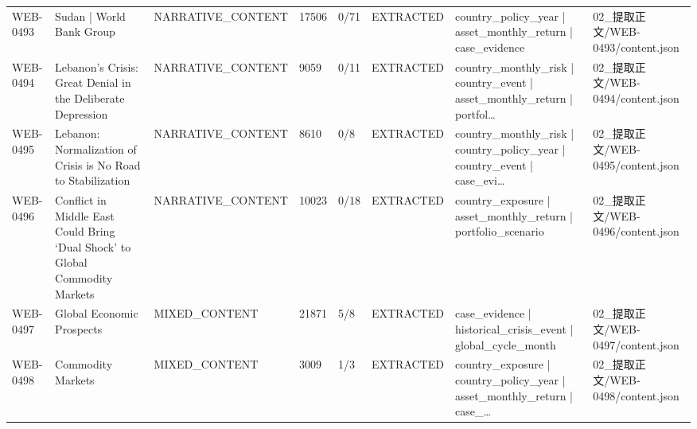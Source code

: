 \begin{landscape}
\begin{longtable}{p{1.8cm}p{4.2cm}p{3.0cm}p{1.4cm}p{1.6cm}p{2.4cm}p{4.2cm}p{4.2cm}}
WEB-0493 & Sudan | World Bank Group & NARRATIVE\_\allowbreak{}CONTENT & 17506 & 0/\allowbreak{}71 & EXTRACTED & country\_\allowbreak{}policy\_\allowbreak{}year | asset\_\allowbreak{}monthly\_\allowbreak{}return | case\_\allowbreak{}evidence & 02\_\allowbreak{}提取正文/\allowbreak{}WEB-0493/\allowbreak{}content.json\\
WEB-0494 & Lebanon’s Crisis: Great Denial in the Deliberate Depression & NARRATIVE\_\allowbreak{}CONTENT & 9059 & 0/\allowbreak{}11 & EXTRACTED & country\_\allowbreak{}monthly\_\allowbreak{}risk | country\_\allowbreak{}event | asset\_\allowbreak{}monthly\_\allowbreak{}return | portfol… & 02\_\allowbreak{}提取正文/\allowbreak{}WEB-0494/\allowbreak{}content.json\\
WEB-0495 & Lebanon: Normalization of Crisis is No Road to Stabilization & NARRATIVE\_\allowbreak{}CONTENT & 8610 & 0/\allowbreak{}8 & EXTRACTED & country\_\allowbreak{}monthly\_\allowbreak{}risk | country\_\allowbreak{}policy\_\allowbreak{}year | country\_\allowbreak{}event | case\_\allowbreak{}evi… & 02\_\allowbreak{}提取正文/\allowbreak{}WEB-0495/\allowbreak{}content.json\\
WEB-0496 & Conflict in Middle East Could Bring ‘Dual Shock’ to Global Commodity Markets & NARRATIVE\_\allowbreak{}CONTENT & 10023 & 0/\allowbreak{}18 & EXTRACTED & country\_\allowbreak{}exposure | asset\_\allowbreak{}monthly\_\allowbreak{}return | portfolio\_\allowbreak{}scenario & 02\_\allowbreak{}提取正文/\allowbreak{}WEB-0496/\allowbreak{}content.json\\
WEB-0497 & Global Economic Prospects & MIXED\_\allowbreak{}CONTENT & 21871 & 5/\allowbreak{}8 & EXTRACTED & case\_\allowbreak{}evidence | historical\_\allowbreak{}crisis\_\allowbreak{}event | global\_\allowbreak{}cycle\_\allowbreak{}month & 02\_\allowbreak{}提取正文/\allowbreak{}WEB-0497/\allowbreak{}content.json\\
WEB-0498 & Commodity Markets & MIXED\_\allowbreak{}CONTENT & 3009 & 1/\allowbreak{}3 & EXTRACTED & country\_\allowbreak{}exposure | country\_\allowbreak{}policy\_\allowbreak{}year | asset\_\allowbreak{}monthly\_\allowbreak{}return | case\_\allowbreak{}… & 02\_\allowbreak{}提取正文/\allowbreak{}WEB-0498/\allowbreak{}content.json\\
\bottomrule\end{longtable}\endgroup\end{landscape}
